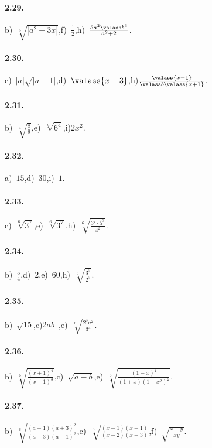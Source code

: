 \paragraph{2.29.}
b)~$\sqrt[5]{\left|a^2+3x\right|}$,\quad f)~$\frac 1 2$,\quad h)~$\frac{5a^2\valass b^3}{a^2+2}$.

\paragraph{2.30.}
c)~$\left|a\right|\sqrt{\left|a-1\right|}$,\quad d)~$\valass{x-3}$,\quad h)$\frac{\valass{x-1}}{\valass b \valass{x+1}}$.

\paragraph{2.31.}
b)~$\sqrt[4]{\frac 8 9}$,\quad e)~$\sqrt[n]{6^4}$,\quad i)$2x^2$.

\paragraph{2.32.}
a)~$15$,\quad d)~$30$,\quad i)~$1$.

\paragraph{2.33.}
c)~$\sqrt[6]{3^7}$,\quad e)~$\sqrt[6]{3^7}$,\quad h)~$\sqrt[6]{\frac{3^2\cdot 5^3}{4^2}}$.

\paragraph{2.34.}
b)~$\frac 5 4$,\quad d)~$2$,\quad e)~$60$,\quad h)~$\sqrt[6]{\frac{3^5}{2^5}}$.

\paragraph{2.35.}
b)~$\sqrt{15}$,\quad c)$2ab$~,\quad e)~$\sqrt[6]{\frac{2^3a^2}{3^4}}$.

\paragraph{2.36.}
b)~$\sqrt[6]{\frac{(x+1)^4}{(x-1)^3}}$,\quad c)~$\sqrt{a-b}$,\quad e)~$\sqrt[6]{\frac{(1-x)^4}{(1+x)(1+x^2)^2}}$.

\paragraph{2.37.}
b)~$\sqrt[6]{\frac{(a+1)(a+3)^2}{(a-3)(a-1)^2}}$,\quad c)~$\sqrt[6]{\frac{(x-1)(x+1)}{(x-2)(x+3)}}$,\quad f)~$\sqrt{\frac{x-y}{xy}}$.

